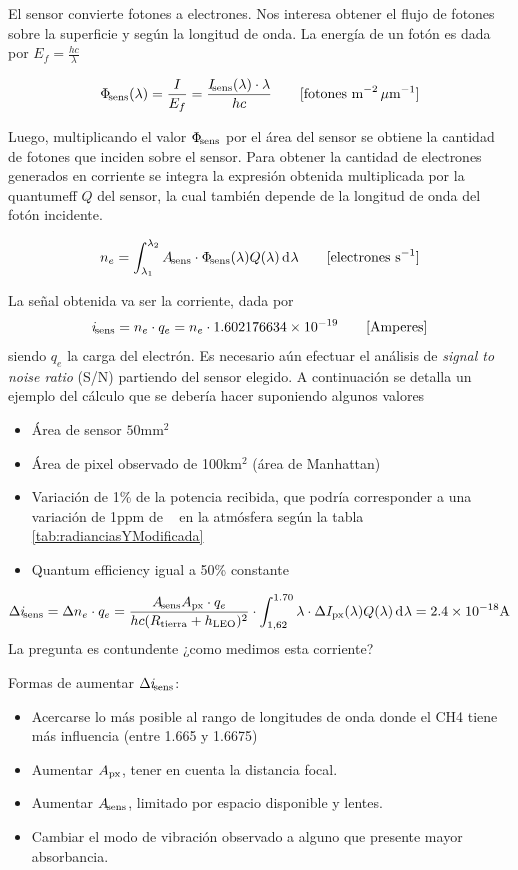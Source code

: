 \documentclass[titlepage,11pt]{article}
\begin{document}
El sensor convierte fotones a electrones. Nos interesa obtener el flujo de fotones sobre la superficie y según la longitud de onda. La energía de un fotón es dada por $E_f = \frac{hc}{\lambda}$ 

\begin{equation}
    \Phi_{{\! \mathrm{\footnotesize sens}}}(\lambda) = \frac{I}{E_f} = \frac{I_{{\! \mathrm{\footnotesize sens}}}(\lambda) \cdot \lambda }{hc} \qquad [\text{fotones m}^{-2}\, \mu \text{m}^{-1}] 
\end{equation}

Luego, multiplicando el valor $\Phi_{{\! \mathrm{\footnotesize sens}}}$ por el área del sensor se obtiene la cantidad de fotones que inciden sobre el sensor. Para obtener la cantidad de electrones generados en corriente se integra la expresión obtenida multiplicada por la \gls{quantumeff} $Q$ del sensor, la cual también depende de la longitud de onda del fotón incidente.

\begin{equation}
    n_e = \int_{\lambda_1}^{\lambda_2} A_\sensor \cdot\Phi_\sensor(\lambda) Q(\lambda) \diff \lambda  \qquad [\text{electrones  s}^{-1}]
\end{equation}

La señal obtenida va ser la corriente, dada por
\[
i_{{\! \mathrm{\footnotesize sens}}} = n_e\cdot q_e = n_e \cdot 1.602176634\times10^{-19} \qquad [\text{Amperes}]
\]
siendo $q_e$ la carga del electrón.
Es necesario aún efectuar el análisis de \textit{signal to noise ratio} (S/N) partiendo del sensor elegido. A continuación se detalla un ejemplo del cálculo que se debería hacer suponiendo algunos valores

\begin{itemize}
    \item Área de sensor $50$mm$^2$
    \item Área de pixel observado de 100km$^2$ (área de Manhattan)
    \item Variación de 1\% de la potencia recibida, que podría corresponder a una variación de 1ppm de \metano~ en la atmósfera según la tabla \ref{tab:radianciasYModificada}
    \item Quantum efficiency igual a 50\% constante
\end{itemize}

\[
\Delta i_\sensor = \Delta n_e \cdot q_e = \frac{A_\sensor A_\px \cdot q_e}{h c (R_\earth + h_\LEO)^2 } \cdot \int_{1,62}^{1.70} \lambda \cdot\Delta \pixrad(\lambda) Q(\lambda) \diff \lambda = 2.4\times 10^{-18} \text{A}
\]
La pregunta es contundente ¿como medimos esta corriente?

Formas de aumentar $\Delta i_{{\! \mathrm{\footnotesize sens}}}$:
\begin{itemize}
    \item Acercarse lo más posible al rango de longitudes de onda donde el CH4 tiene más influencia (entre 1.665 y 1.6675)
    \item Aumentar $A_{\mathrm{px}}$, tener en cuenta la distancia focal.
    \item Aumentar $A_{{\! \mathrm{\footnotesize sens}}}$, limitado por espacio disponible y lentes.
    \item Cambiar el modo de vibración observado a alguno que presente mayor absorbancia.
\end{itemize}{}
\end{document}
